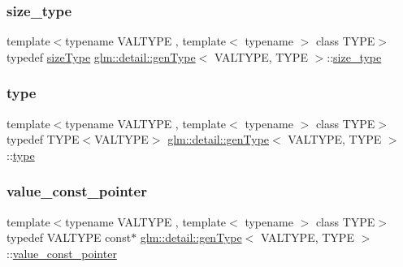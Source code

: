 \mbox{\label{structglm_1_1detail_1_1gen_type_af4fa06eb65eebb96960fae19a3b439eb}} 
\subsubsection{\texorpdfstring{size\+\_\+type}{size\_type}}
{\footnotesize\ttfamily template$<$typename V\+A\+L\+T\+Y\+PE , template$<$ typename $>$ class T\+Y\+PE$>$ \\
typedef \hyperlink{namespaceglm_ae49d80f7bfe4be96585fe8f1d3431cc6}{size\+Type} \hyperlink{structglm_1_1detail_1_1gen_type}{glm\+::detail\+::gen\+Type}$<$ V\+A\+L\+T\+Y\+PE, T\+Y\+PE $>$\+::\hyperlink{structglm_1_1detail_1_1gen_type_af4fa06eb65eebb96960fae19a3b439eb}{size\+\_\+type}}

\mbox{\label{structglm_1_1detail_1_1gen_type_a17dbd44c7a86d09e6ea05b72cb02bccf}} 
\subsubsection{\texorpdfstring{type}{type}}
{\footnotesize\ttfamily template$<$typename V\+A\+L\+T\+Y\+PE , template$<$ typename $>$ class T\+Y\+PE$>$ \\
typedef T\+Y\+PE$<$V\+A\+L\+T\+Y\+PE$>$ \hyperlink{structglm_1_1detail_1_1gen_type}{glm\+::detail\+::gen\+Type}$<$ V\+A\+L\+T\+Y\+PE, T\+Y\+PE $>$\+::\hyperlink{structglm_1_1detail_1_1gen_type_a17dbd44c7a86d09e6ea05b72cb02bccf}{type}}

\mbox{\label{structglm_1_1detail_1_1gen_type_a34e169ae6d50e1c76574c850eae2c7fc}} 
\subsubsection{\texorpdfstring{value\+\_\+const\+\_\+pointer}{value\_const\_pointer}}
{\footnotesize\ttfamily template$<$typename V\+A\+L\+T\+Y\+PE , template$<$ typename $>$ class T\+Y\+PE$>$ \\
typedef V\+A\+L\+T\+Y\+PE const$\ast$ \hyperlink{structglm_1_1detail_1_1gen_type}{glm\+::detail\+::gen\+Type}$<$ V\+A\+L\+T\+Y\+PE, T\+Y\+PE $>$\+::\hyperlink{structglm_1_1detail_1_1gen_type_a34e169ae6d50e1c76574c850eae2c7fc}{value\+\_\+const\+\_\+pointer}}

